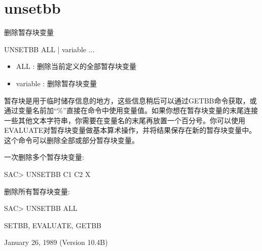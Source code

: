 \section{unsetbb}
\label{cmd:unsetbb}

删除暂存块变量

UNSETBB ALL | variable ...

\begin{itemize}
\item ALL : 删除当前定义的全部暂存块变量 
\item variable : 删除暂存块变量 
\end{itemize}

暂存块是用于临时储存信息的地方，这些信息稍后可以通过GETBB命令获取，或通过变量名前加``\%''直接在命令中使用变量值。如果你想在暂存块变量的末尾连接一些其他文本字符串，你需要在变量名的末尾再放置一个百分号。你可以使用EVALUATE对暂存块变量做基本算术操作，并将结果保存在新的暂存块变量中。这个命令可以删除全部或部分暂存块变量。

一次删除多个暂存块变量:
\begin{SACCode}
SAC> UNSETBB C1 C2 X
\end{SACCode}

删除所有暂存块变量:
\begin{SACCode}
SAC> UNSETBB ALL
\end{SACCode}

SETBB, EVALUATE, GETBB

January 26, 1989 (Version 10.4B)

